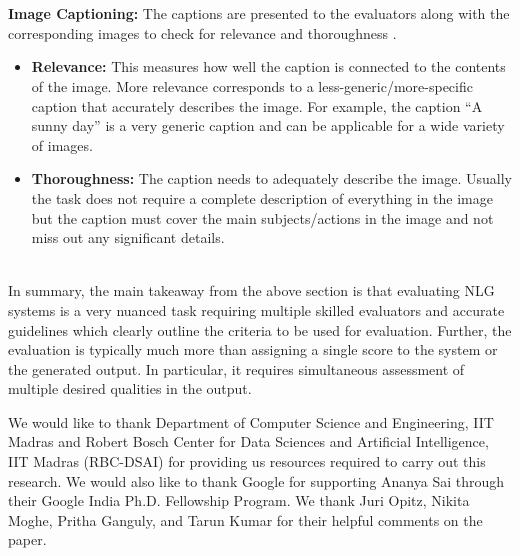 ~\\\\
\textbf{Image Captioning:} The captions are presented to the evaluators along with the corresponding images to check for relevance and thoroughness .
\begin{itemize}
    \item \textbf{Relevance:} This measures how well the caption is connected to the contents of the image. More relevance corresponds to a less-generic/more-specific caption that accurately describes the image. For example, the caption ``A sunny day'' is a very generic caption and can be applicable for a wide variety of images.
    \item \textbf{Thoroughness:} The caption needs to adequately describe the image. Usually the task does not require a complete description of everything in the image but the caption must cover the main subjects/actions in the image and not miss out any significant details.
\end{itemize}
~\\
In summary, the main takeaway from the above section is that evaluating NLG systems is a very nuanced task requiring multiple skilled evaluators and accurate guidelines which clearly outline the criteria to be used for evaluation. Further, the evaluation is typically much more than assigning a single score to the system or the generated output. In particular, it requires simultaneous assessment of multiple desired qualities in the output.
\begin{acks}
We would like to thank Department of Computer Science and Engineering, IIT Madras and Robert Bosch Center for Data Sciences and Artificial Intelligence, IIT Madras (RBC-DSAI) for providing us resources required to carry out this research. We would also like to thank Google for supporting Ananya Sai through their Google India Ph.D. Fellowship Program. We thank Juri Opitz, Nikita Moghe, Pritha Ganguly, and Tarun Kumar for their helpful comments on the paper.
\end{acks}


\appendix



